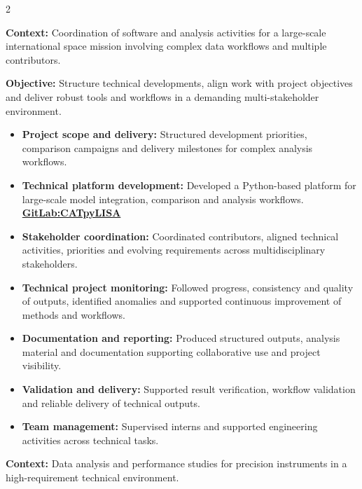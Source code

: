 \documentclass[8pt,a4paper,ragged2e,withhyper]{altacv}
\begin{document}
\begin{paracol}{2}
\divider


\textbf{Context:} Coordination of software and analysis activities for a large-scale international space mission involving complex data workflows and multiple contributors.

\textbf{Objective:} Structure technical developments, align work with project objectives and deliver robust tools and workflows in a demanding multi-stakeholder environment.

\begin{itemize}
\item \textbf{Project scope and delivery:} Structured development priorities, comparison campaigns and delivery milestones for complex analysis workflows.
\item \textbf{Technical platform development:} Developed a Python-based platform for large-scale model integration, comparison and analysis workflows. \textcolor{DarkPastelRed}{\href{https://gitlab.oca.eu/gboileau/lisa_l3_tools}{\bf GitLab:CATpyLISA}}
\item \textbf{Stakeholder coordination:} Coordinated contributors, aligned technical activities, priorities and evolving requirements across multidisciplinary stakeholders.
\item \textbf{Technical project monitoring:} Followed progress, consistency and quality of outputs, identified anomalies and supported continuous improvement of methods and workflows.
\item \textbf{Documentation and reporting:} Produced structured outputs, analysis material and documentation supporting collaborative use and project visibility.
\item \textbf{Validation and delivery:} Supported result verification, workflow validation and reliable delivery of technical outputs.
\item \textbf{Team management:} Supervised interns and supported engineering activities across technical tasks.
\end{itemize}

\divider


\textbf{Context:} Data analysis and performance studies for precision instruments in a high-requirement technical environment.


\end{paracol}
\end{document}
